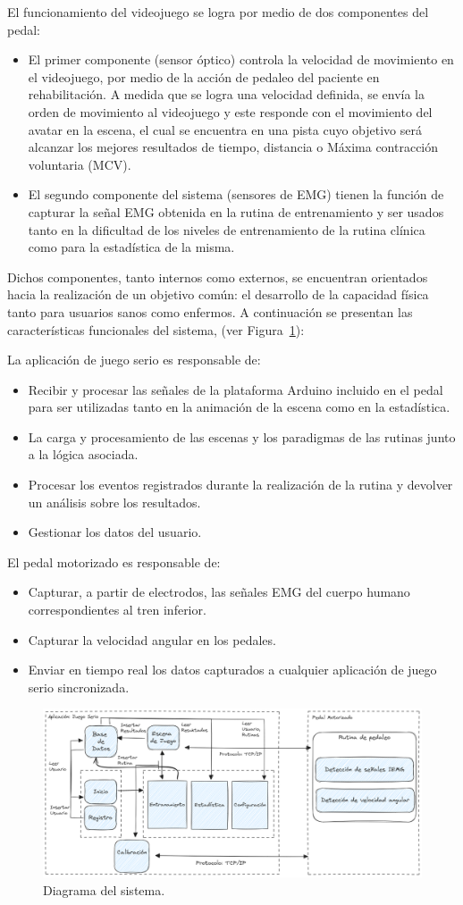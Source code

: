 El funcionamiento del videojuego se logra por medio de dos componentes del pedal:
\begin{itemize}
    \item El primer componente (sensor óptico) controla la velocidad de movimiento en el videojuego, por  medio de la acción de pedaleo del paciente en rehabilitación. A medida que se logra una velocidad definida, se envía la orden de movimiento al videojuego y este responde con el movimiento del avatar en la escena, el cual se encuentra en una pista cuyo objetivo será alcanzar los mejores resultados de tiempo, distancia o  Máxima contracción voluntaria (MCV).
    \item El segundo componente del sistema (sensores de EMG) tienen la función de capturar la señal EMG obtenida en la rutina de entrenamiento y ser usados tanto en la dificultad de los niveles de entrenamiento de la rutina clínica como para la estadística de la misma.
\end{itemize}
    
Dichos componentes, tanto internos como externos, se encuentran orientados hacia  la realización de un objetivo común: el desarrollo de la capacidad física tanto para usuarios sanos como enfermos. A continuación se presentan las características funcionales del sistema, (ver Figura~\ref{fig: system}):

La aplicación de juego serio es responsable de:
\begin{itemize}
    \item Recibir y procesar las señales de la plataforma Arduino incluido en el pedal para ser utilizadas tanto en la animación de la escena como en la estadística.
    \item La carga y procesamiento de las escenas y los paradigmas de las rutinas junto a la lógica asociada. 
    \item Procesar los eventos registrados durante la realización de la rutina y devolver un análisis sobre los resultados.
    \item Gestionar los datos del usuario.
\end{itemize}

El pedal motorizado es responsable de:
\begin{itemize}
    \item Capturar, a partir de electrodos, las señales EMG del cuerpo humano correspondientes al tren inferior.
    \item Capturar la velocidad angular en los pedales.
    \item Enviar en tiempo real los datos capturados a cualquier aplicación de juego serio sincronizada.
\end{itemize}
    
\begin{figure}[ht]
    \centering
    \includegraphics[scale=0.3]{images/system.png}
    \caption{Diagrama del sistema.}
    \label{fig: system}
\end{figure}